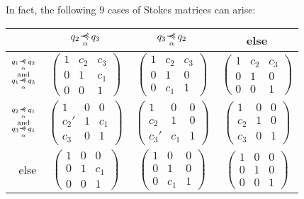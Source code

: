 In fact, the following $9$ cases of Stokes matrices can arise:
\begin{center}
  \def\arraystretch{1.3}
  \setlength\tabcolsep{4mm}
  \begin{tabular}{r|c|c|c}
    & $q_2\myrel{\alpha}q_3$ & $q_3\myrel{\alpha}q_2$ & else
    \tabularnewline
    \hline
    $\substack{q_1\myrel{\alpha}q_2\\\text{and} \\q_1\myrel{\alpha}q_3}$
    & $\begin{pmatrix} 1 & c_2 & c_3 \\0 & 1 & c_1 \\0 & 0 & 1 \end{pmatrix}$
   \cellcolor{blue!15}
    & $\begin{pmatrix} 1 & c_2 & c_3 \\0 & 1 & 0 \\0 & c_1 & 1 \end{pmatrix}$
   \cellcolor{blue!15}
    & $\begin{pmatrix} 1 & c_2 & c_3 \\0 & 1 & 0 \\0 & 0 & 1 \end{pmatrix}$
   \cellcolor{green!15}
    \tabularnewline
    \hline
    $\substack{q_2\myrel{\alpha}q_1\\\text{and} \\q_3\myrel{\alpha}q_1}$
    & $\begin{pmatrix} 1 & 0 & 0 \\c_2' & 1 & c_1 \\c_3 & 0 & 1 \end{pmatrix}$
   \cellcolor{blue!15}
    & $\begin{pmatrix} 1 & 0 & 0 \\c_2 & 1 & 0 \\c_3' & c_1 & 1 \end{pmatrix}$
   \cellcolor{blue!15}
    & $\begin{pmatrix} 1 & 0 & 0 \\c_2 & 1 & 0 \\c_3 & 0 & 1 \end{pmatrix}$
   \cellcolor{green!15}
    \tabularnewline
    \hline
    else
    & $\begin{pmatrix} 1 & 0 & 0 \\0 & 1 & c_1 \\0 & 0 & 1 \end{pmatrix}$
   \cellcolor{purple!15}
    & $\begin{pmatrix} 1 & 0 & 0 \\0 & 1 & 0 \\0 & c_1 & 1 \end{pmatrix}$
   \cellcolor{purple!15}
    & $\begin{pmatrix} 1 & 0 & 0 \\0 & 1 & 0 \\0 & 0 & 1 \end{pmatrix}$
  \end{tabular}
\end{center}
